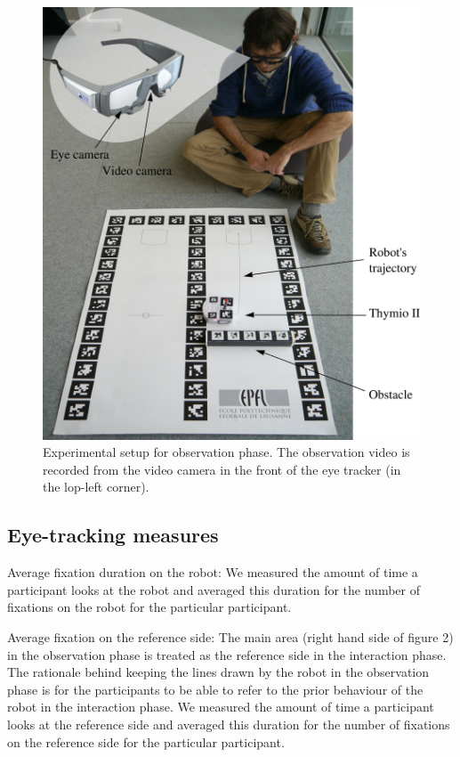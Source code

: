 \documentclass{sig-alternate}
\begin{document}
\begin{figure}
    \centering
    \includegraphics[width=0.9\linewidth]{setup}
    \caption{\small Experimental setup for observation phase. The observation
    video is recorded from the video camera in the front of the eye tracker (in
    the lop-left corner).}

    \label{expe}
\end{figure}


\subsection{Eye-tracking measures}

Average fixation duration on the robot: We measured the amount of time a
participant looks at the robot and averaged this duration for the number
of fixations on the robot for the particular participant.

Average fixation on the reference side: The main area (right hand side
of figure 2) in the observation phase is treated as the reference side
in the interaction phase. The rationale behind keeping the lines drawn
by the robot in the observation phase is for the participants to be able
to refer to the prior behaviour of the robot in the interaction phase. We
measured the amount of time a participant looks at the reference side
and averaged this duration for the number of fixations on the reference
side for the particular participant.
\end{document}
